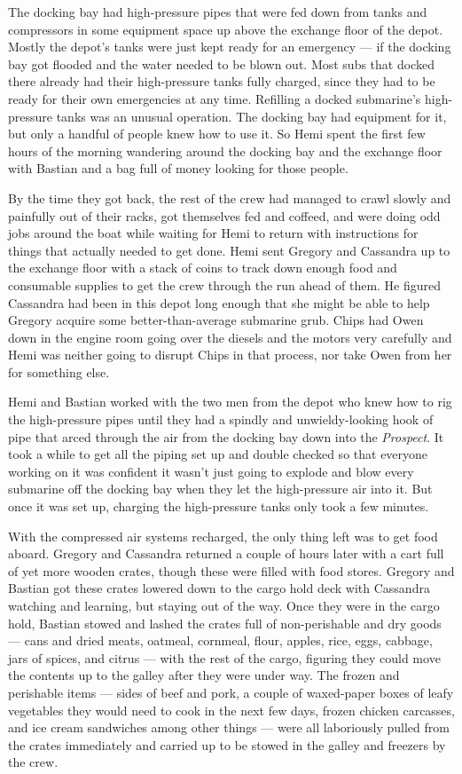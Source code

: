 \documentclass[
]{scrbook}
\begin{document}
The docking bay had high-pressure pipes that were fed down from tanks
and compressors in some equipment space up above the exchange floor of
the depot. Mostly the depot's tanks were just kept ready for an
emergency --- if the docking bay got flooded and the water needed to be
blown out. Most subs that docked there already had their high-pressure
tanks fully charged, since they had to be ready for their own
emergencies at any time. Refilling a docked submarine's high-pressure
tanks was an unusual operation. The docking bay had equipment for it,
but only a handful of people knew how to use it. So Hemi spent the first
few hours of the morning wandering around the docking bay and the
exchange floor with Bastian and a bag full of money looking for those
people.

By the time they got back, the rest of the crew had managed to crawl
slowly and painfully out of their racks, got themselves fed and coffeed,
and were doing odd jobs around the boat while waiting for Hemi to return
with instructions for things that actually needed to get done. Hemi sent
Gregory and Cassandra up to the exchange floor with a stack of coins to
track down enough food and consumable supplies to get the crew through
the run ahead of them. He figured Cassandra had been in this depot long
enough that she might be able to help Gregory acquire some
better-than-average submarine grub. Chips had Owen down in the engine
room going over the diesels and the motors very carefully and Hemi was
neither going to disrupt Chips in that process, nor take Owen from her
for something else.

Hemi and Bastian worked with the two men from the depot who knew how to
rig the high-pressure pipes until they had a spindly and
unwieldy-looking hook of pipe that arced through the air from the
docking bay down into the \emph{Prospect}. It took a while to get all
the piping set up and double checked so that everyone working on it was
confident it wasn't just going to explode and blow every submarine off
the docking bay when they let the high-pressure air into it. But once it
was set up, charging the high-pressure tanks only took a few minutes.

With the compressed air systems recharged, the only thing left was to
get food aboard. Gregory and Cassandra returned a couple of hours later
with a cart full of yet more wooden crates, though these were filled
with food stores. Gregory and Bastian got these crates lowered down to
the cargo hold deck with Cassandra watching and learning, but staying
out of the way. Once they were in the cargo hold, Bastian stowed and
lashed the crates full of non-perishable and dry goods --- cans and
dried meats, oatmeal, cornmeal, flour, apples, rice, eggs, cabbage, jars
of spices, and citrus --- with the rest of the cargo, figuring they
could move the contents up to the galley after they were under way. The
frozen and perishable items --- sides of beef and pork, a couple of
waxed-paper boxes of leafy vegetables they would need to cook in the
next few days, frozen chicken carcasses, and ice cream sandwiches among
other things --- were all laboriously pulled from the crates immediately
and carried up to be stowed in the galley and freezers by the crew.
\end{document}
